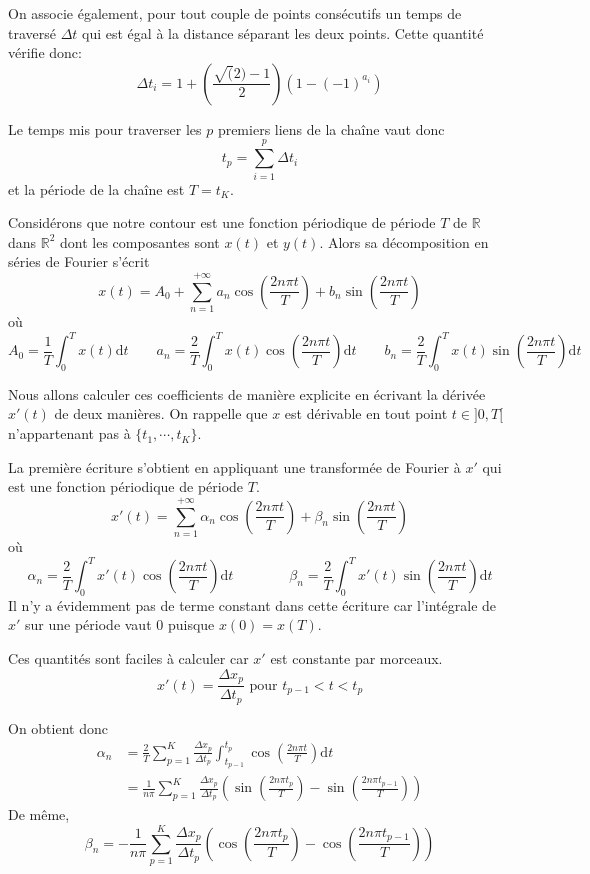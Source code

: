On associe également, pour tout couple de points consécutifs 
un temps de traversé $\Delta t$ qui est égal à la distance 
séparant les deux points.
Cette quantité vérifie donc:
\[
\Delta t_i = 1 + \left( \frac{\sqrt(2) - 1}{2} \right) \left( 1 - (-1)^{a_i} \right)
\]

Le temps mis pour traverser les $p$ premiers liens de la chaîne vaut donc 
\[
t_p = \sum_{i = 1}^{p} \Delta t_i
\]
et la période de la chaîne est $T = t_K$.



Considérons que notre contour est une fonction périodique de 
période $T$ de $\mathbb{R}$ dans $\mathbb{R}^2$ dont les composantes 
sont $x(t)$ et $y(t)$.
Alors sa décomposition en séries de Fourier s'écrit
\[
x(t) = A_0 + \sum_{n = 1}^{+\infty} a_n \cos\left(\frac{2n\pi t}{T}\right) 
  + b_n \sin\left(\frac{2n\pi t}{T}\right) 
\]
où
\[
A_0 = \frac{1}{T} \int_{0}^{T} x(t) \mathrm{d}t  \qquad
a_n = \frac{2}{T} \int_{0}^{T} x(t) \cos\left(\frac{2n\pi t}{T}\right)  \mathrm{d}t  \qquad
b_n = \frac{2}{T} \int_{0}^{T} x(t) \sin\left(\frac{2n\pi t}{T}\right)  \mathrm{d}t 
\]

Nous allons calculer ces coefficients de manière explicite en écrivant 
la dérivée $x'(t)$ de deux manières.
On rappelle que $x$ est dérivable en tout point $t \in ]0, T[$ 
n'appartenant pas à $\{ t_1, \cdots, t_K \}$.

La première écriture s'obtient en appliquant une transformée de Fourier 
à $x'$ qui est une fonction périodique de période $T$. 
\[
x'(t) = \sum_{n = 1}^{+\infty} \alpha_n \cos\left(\frac{2n\pi t}{T}\right) 
  + \beta_n \sin\left(\frac{2n\pi t}{T}\right) 
\]
où
\[
\alpha_n = \frac{2}{T} \int_{0}^{T} x'(t) \cos\left(\frac{2n\pi t}{T}\right)  \mathrm{d}t  \qquad \qquad
\beta_n = \frac{2}{T} \int_{0}^{T} x'(t) \sin\left(\frac{2n\pi t}{T}\right)  \mathrm{d}t 
\]
Il n'y a évidemment pas de terme constant dans cette écriture car 
l'intégrale de $x'$ sur une période vaut 0 puisque $x(0) = x(T)$.

Ces quantités sont faciles à calculer car $x'$ est constante par 
morceaux.
\[
x'(t) = \frac{\Delta x_p}{\Delta t_p} \text{ pour } t_{p-1} < t < t_p
\]

On obtient donc
\begin{align*}
\alpha_n &= \frac{2}{T} \sum_{p = 1}^{K} \frac{\Delta x_p}{\Delta t_p} \int_{t_{p-1}}^{t_p} \cos\left(\frac{2n\pi t}{T}\right)  \mathrm{d}t  \\
         &= \frac{1}{n \pi} \sum_{p = 1}^{K} \frac{\Delta x_p}{\Delta t_p} \left( \sin\left(\frac{2n\pi t_p}{T}\right) - \sin\left(\frac{2n\pi t_{p-1}}{T}\right)  \right)
\end{align*}
De même, 
\[
\beta_n = -\frac{1}{n \pi} \sum_{p = 1}^{K} \frac{\Delta x_p}{\Delta t_p} \left( \cos\left(\frac{2n\pi t_p}{T}\right) - \cos\left(\frac{2n\pi t_{p-1}}{T}\right)  \right)
\]

